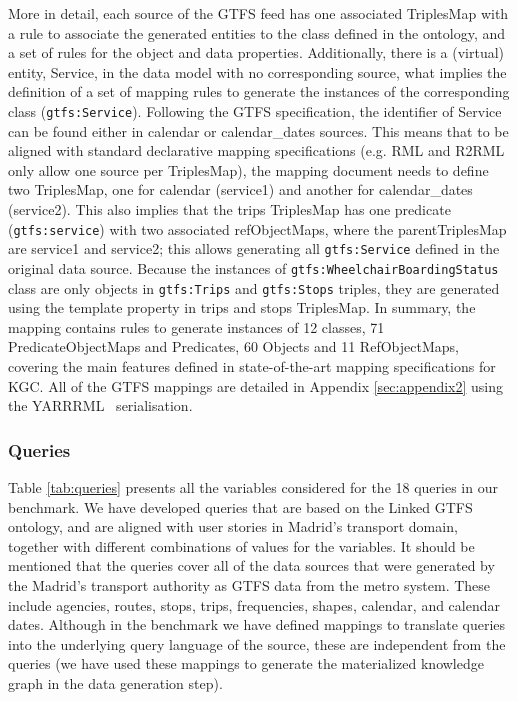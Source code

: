 More in detail, each source of the GTFS feed has one associated TriplesMap with a rule to associate the generated entities to the class defined in the ontology, and a set of rules for the object and data properties. Additionally, there is a (virtual) entity, Service, in the data model with no corresponding source, what implies the definition of a set of mapping rules to generate the instances of the corresponding class (\texttt{gtfs:Service}). Following the GTFS specification, the identifier of Service can be found either in calendar or calendar\_dates sources. This means that to be aligned with standard declarative mapping specifications (e.g. RML and R2RML only allow one source per TriplesMap), the mapping document needs to define two TriplesMap, one for calendar (service1) and another for calendar\_dates (service2). This also implies that the trips TriplesMap has one predicate (\texttt{gtfs:service}) with two associated refObjectMaps, where the parentTriplesMap are service1 and service2; this allows generating all \texttt{gtfs:Service} defined in the original data source. Because the instances of \texttt{gtfs:WheelchairBoardingStatus} class are only objects in \texttt{gtfs:Trips} and \texttt{gtfs:Stops} triples, they are generated using the template property in trips and stops TriplesMap. In summary, the mapping contains rules to generate instances of 12 classes, 71 PredicateObjectMaps and Predicates, 60 Objects and 11 RefObjectMaps, covering the main features defined in state-of-the-art mapping specifications for KGC. All of the GTFS mappings are detailed in Appendix \ref{sec:appendix2} using the YARRRML~\citep{Heyvaert2018Declarative} serialisation.

\subsubsection{Queries}
Table \ref{tab:queries} presents all the variables considered for the 18 queries in our benchmark. We have developed queries that are based on the Linked GTFS ontology, and are aligned with user stories in Madrid's transport domain, together with different combinations of values for the variables. It should be mentioned that the queries cover all of the data sources that were generated by the Madrid's transport authority as GTFS data from the metro system. These include agencies, routes, stops, trips, frequencies, shapes, calendar, and calendar dates. Although in the benchmark we have defined mappings to translate queries into the underlying query language of the source, these are independent from the queries (we have used these mappings to generate the materialized knowledge graph in the data generation step).

